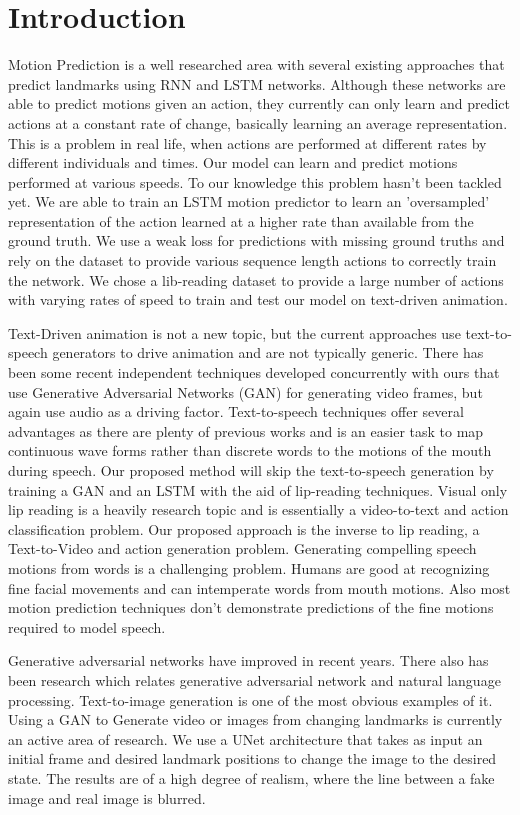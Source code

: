 \documentclass[10pt,twocolumn,letterpaper]{article}
\begin{document}
\section{Introduction}
 Motion Prediction is a well researched area with several existing approaches that predict landmarks using RNN and LSTM networks. Although these networks are able to predict motions given an action, they currently can only learn and predict actions at a constant rate of change, basically learning an average representation. This is a problem in real life, when actions are performed at different rates by different individuals and times. Our model can learn and predict motions performed at various speeds. To our knowledge this problem hasn't been tackled yet. We are able to train an LSTM motion predictor to learn an 'oversampled' representation of the action learned at a higher rate than available from the ground truth. We use a weak loss for predictions with missing ground truths and rely on the dataset to provide various sequence length actions to correctly train the network. We chose a lib-reading dataset to provide a large number of actions with varying rates of speed to train and test our model on text-driven animation.

 Text-Driven animation is not a new topic, but the current approaches use text-to-speech generators to drive animation and are not typically generic. There has been some recent independent techniques developed concurrently with ours that use Generative Adversarial Networks (GAN) for generating video frames, but again use audio as a driving factor. Text-to-speech techniques offer several advantages as there are plenty of previous works and is an easier task to map continuous wave forms rather than discrete words to the motions of the mouth during speech. Our proposed method will skip the text-to-speech generation by training a GAN and an LSTM with the aid of lip-reading techniques. Visual only lip reading is a heavily research topic and is essentially a video-to-text and action classification problem. Our proposed approach is the inverse to lip reading, a Text-to-Video and action generation problem. Generating compelling speech motions from words is a challenging problem. Humans are good at recognizing fine facial movements and can intemperate words from mouth motions. Also most motion prediction techniques don't demonstrate predictions of the fine motions required to model speech.

 Generative adversarial networks have improved in recent years. There also has been research which relates generative adversarial network and natural language processing. Text-to-image generation is one of the most obvious examples of it. Using a GAN to Generate video or images from changing landmarks is currently an active area of research. We use a UNet architecture that takes as input an initial frame and desired landmark positions to change the image to the desired state. The results are of a high degree of realism, where the line between a fake image and real image is blurred.
  
\end{document}
